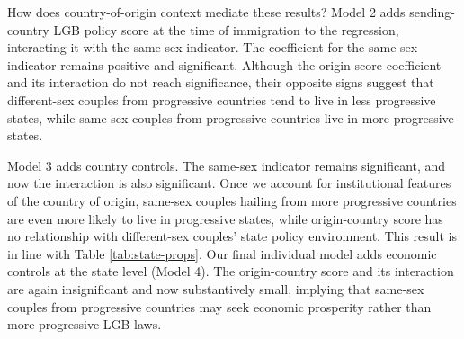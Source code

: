 \documentclass[
  12pt,
]{article}
\begin{document}
How does country-of-origin context mediate these results? Model 2 adds sending-country LGB policy score at the time of immigration to the regression, interacting it with the same-sex indicator. The coefficient for the same-sex indicator remains positive and significant. Although the origin-score coefficient and its interaction do not reach significance, their opposite signs suggest that different-sex couples from progressive countries tend to live in less progressive states, while same-sex couples from progressive countries live in more progressive states.

Model 3 adds country controls. The same-sex indicator remains significant, and now the interaction is also significant. Once we account for institutional features of the country of origin, same-sex couples hailing from more progressive countries are even more likely to live in progressive states, while origin-country score has no relationship with different-sex couples' state policy environment. This result is in line with Table \ref{tab:state-props}. Our final individual model adds economic controls at the state level (Model 4). The origin-country score and its interaction are again insignificant and now substantively small, implying that same-sex couples from progressive countries may seek economic prosperity rather than more progressive LGB laws.

 
  \providecommand{\huxb}[2]{\arrayrulecolor[RGB]{#1}\global\arrayrulewidth=#2pt}
  \providecommand{\huxvb}[2]{\color[RGB]{#1}\vrule width #2pt}
  \providecommand{\huxtpad}[1]{\rule{0pt}{#1}}
  \providecommand{\huxbpad}[1]{\rule[-#1]{0pt}{#1}}
\end{document}
